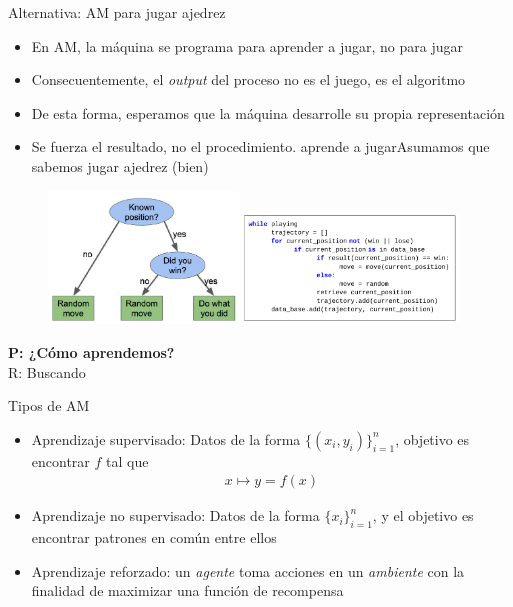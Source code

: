 \documentclass[9pt]{beamer}
\begin{document}
\begin{frame}{Alternativa: AM para jugar ajedrez}

  \begin{itemize}
    \item En AM, la máquina se programa para aprender a jugar, no para jugar
    \item Consecuentemente, el \emph{output} del proceso no es el juego, es el algoritmo
    \item De esta forma, esperamos que la máquina desarrolle su propia representación
    \item Se fuerza el resultado, no el procedimiento. aprende a jugarAsumamos que sabemos jugar ajedrez (bien)
  \end{itemize}
  \vfill
  \begin{figure}
    \centering
    \includegraphics[width=0.45\textwidth]{../img/cap0_chess_ml_diag}\hfill \includegraphics[width=0.52\textwidth]{../img/cap0_chess_ml_code}
  \end{figure}
  \textbf{P: ¿Cómo aprendemos?}\\ R: Buscando 
\end{frame}

\begin{frame}{Tipos de AM}

  \begin{itemize}
    \item Aprendizaje supervisado: 
    Datos de la forma $\{(x_i,y_i)\}_{i=1}^n$, objetivo es encontrar $f$ tal que
    \begin{align}
    x \mapsto y = f(x)
    \end{align}
    \item Aprendizaje no supervisado: Datos de la forma $\{x_i\}_{i=1}^n$, y el objetivo es encontrar patrones en común entre ellos
    \item Aprendizaje reforzado: un \emph{agente}  toma acciones en un \emph{ambiente} con la finalidad de maximizar una función de recompensa
  \end{itemize}

\end{frame}
\end{document}
